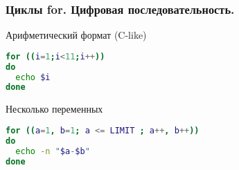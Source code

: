 \begin{frame}[fragile]
\frametitle{Циклы for. Цифровая последовательность.}
  \begin{block}{Арифметический формат (C-like) }
\begin{lstlisting}[language=bash,frame=single]
for ((i=1;i<11;i++))
do 
  echo $i
done  
\end{lstlisting}
  \end{block}

  \begin{block}{Несколько переменных}
    \begin{lstlisting}[language=sh,frame=single]
for ((a=1, b=1; a <= LIMIT ; a++, b++))
do
  echo -n "$a-$b"
done
\end{lstlisting}
  \end{block}
\end{frame}
